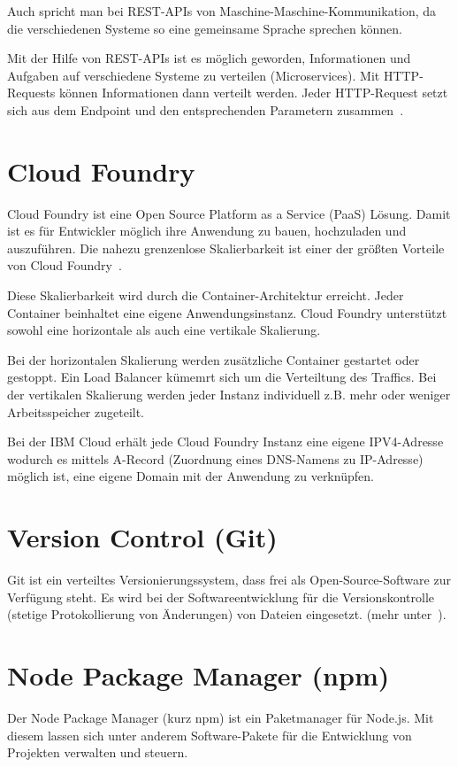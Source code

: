 Auch spricht man bei REST-APIs von Maschine-Maschine-Kommunikation, da die verschiedenen Systeme so eine gemeinsame
Sprache sprechen können.

Mit der Hilfe von REST-APIs ist es möglich geworden, Informationen und Aufgaben auf verschiedene Systeme zu verteilen
(Microservices). Mit HTTP-Requests können Informationen dann verteilt werden. Jeder HTTP-Request setzt sich aus dem
Endpoint und den entsprechenden Parametern zusammen~\cite{online_grundlagen_rest}.

\section{Cloud Foundry}
Cloud Foundry ist eine Open Source Platform as a Service (PaaS) Lösung. Damit ist es für Entwickler möglich ihre
Anwendung zu bauen, hochzuladen und auszuführen. Die nahezu grenzenlose Skalierbarkeit ist einer der größten Vorteile
von Cloud Foundry~\cite{book_grundlagen_cloudfoundry}.

Diese Skalierbarkeit wird durch die Container-Architektur erreicht. Jeder Container beinhaltet eine eigene
Anwendungsinstanz. Cloud Foundry unterstützt sowohl eine horizontale als auch eine vertikale Skalierung.

Bei der horizontalen Skalierung werden zusätzliche Container gestartet oder gestoppt. Ein Load Balancer kümemrt sich um
die Verteiltung des Traffics. Bei der vertikalen Skalierung werden jeder Instanz individuell z.B. mehr oder weniger
Arbeitsspeicher zugeteilt.

Bei der IBM Cloud erhält jede Cloud Foundry Instanz eine eigene IPV4-Adresse wodurch es mittels A-Record (Zuordnung eines
DNS-Namens zu IP-Adresse) möglich ist, eine eigene Domain mit der Anwendung zu verknüpfen.

\section{Version Control (Git)}
Git ist ein verteiltes Versionierungssystem, dass frei als Open-Source-Software zur Verfügung steht. Es wird bei der
Softwareentwicklung für die Versionskontrolle (stetige Protokollierung von Änderungen) von Dateien eingesetzt. (mehr
unter~\cite{book_grundlagen_git}).

\section{Node Package Manager (npm)}
Der Node Package Manager (kurz npm) ist ein Paketmanager für Node.js. Mit diesem lassen sich unter anderem
Software-Pakete für die Entwicklung von Projekten verwalten und steuern.

